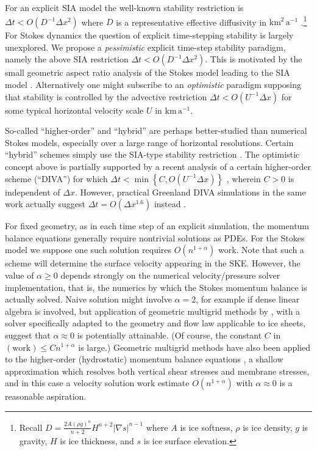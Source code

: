 \documentclass[twocolumn,letterpaper]{igs}
\newcommand{\grad}{\nabla}
\begin{document}
For an explicit SIA model the well-known stability restriction is $\Delta t < O(D^{-1} \Delta x^2)$ where $D$ is a representative effective diffusivity in $\text{km}^2\,\text{a}^{-1}$ \citep{Bueleretal2005,HindmarshPayne1996}.\footnote{Recall $\displaystyle D = \frac{2 A (\rho g)^n}{n+2} H^{n+2} |\grad s|^{n-1}$ where $A$ is ice softness, $\rho$ is ice density, $g$ is gravity, $H$ is ice thickness, and $s$ is ice surface elevation.}
For Stokes dynamics the question of explicit time-stepping stability is largely unexplored.  We propose a \emph{pessimistic} explicit time-step stability paradigm, namely the above SIA restriction $\Delta t < O(D^{-1} \Delta x^2)$.  This is motivated by the small geometric aspect ratio analysis of the Stokes model leading to the SIA model \citep{GreveBlatter2009}.  Alternatively one might subscribe to an \emph{optimistic} paradigm supposing that stability is controlled by the advective restriction $\Delta t < O(U^{-1} \Delta x)$ for some typical horizontal velocity scale $U$ in $\text{km}\,\text{a}^{-1}$.

So-called ``higher-order'' and ``hybrid'' are perhaps better-studied than numerical Stokes models, especially over a large range of horizontal resolutions.  Certain ``hybrid'' schemes simply use the SIA-type stability restriction \citep{Winkelmannetal2011}.  The optimistic concept above is partially supported by a recent analysis of a certain higher-order scheme (``DIVA'') for which $\Delta t < \min\left\{C,O(U^{-1} \Delta x)\right\}$ \citep[equations (52) and (56)]{Robinsonetal2022}, wherein $C>0$ is independent of $\Delta x$.  However, practical Greenland DIVA simulations in the same work actually suggest $\Delta t = O(\Delta x^{1.6})$ instead \citep[Figure 3(a)]{Robinsonetal2022}.

For fixed geometry, as in each time step of an explicit simulation, the momentum balance equations generally require nontrivial solutions as PDEs.  For the Stokes model we suppose one such solution requires $O(n^{1+\alpha})$ work.  Note that such a scheme will determine the surface velocity appearing in the SKE.  However, the value of $\alpha \ge 0$ depends strongly on the numerical velocity/pressure solver implementation, that is, the numerics by which the Stokes momentum balance is actually solved.  Naive solution might involve $\alpha=2$, for example if dense linear algebra is involved, but application of geometric multigrid methods by \cite{IsaacStadlerGhattas2015}, with a solver specifically adapted to the geometry and flow law applicable to ice sheets, suggest that $\alpha \approx 0$ is potentially attainable.  (Of course, the constant $C$ in $(\text{work}) \le C n^{1+\alpha}$ is large.)  Geometric multigrid methods have also been applied to the higher-order (hydrostatic) momentum balance equations \citep{BrownSmithAhmadia2013}, a shallow approximation which resolves both vertical shear stresses and membrane stresses, and in this case a velocity solution work estimate $O(n^{1+\alpha})$ with $\alpha \approx 0$ is a reasonable aspiration.
\end{document}
